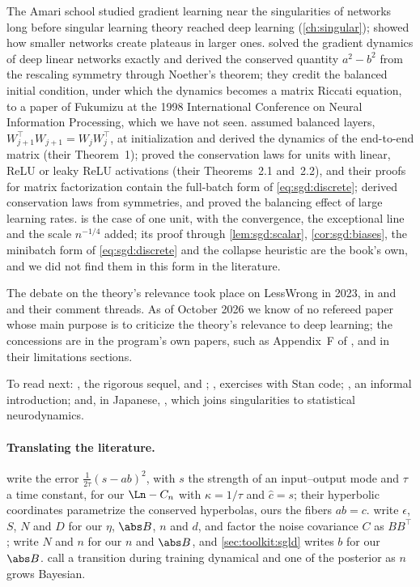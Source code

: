 \begin{refsection}
\notesandrefs
The Amari school studied gradient learning near the singularities of networks long before singular learning theory reached deep learning (\cref{ch:singular}); \textcite{FukumizuAmari2000} showed how smaller networks create plateaus in larger ones. \Textcite{SaxeEtAl2014} solved the gradient dynamics of deep linear networks exactly and derived the conserved quantity $a^2-b^2$ from the rescaling symmetry through Noether's theorem; they credit the balanced initial condition, under which the dynamics becomes a matrix Riccati equation, to a paper of Fukumizu at the 1998 International Conference on Neural Information Processing, which we have not seen. \Textcite{AroraEtAl2018} assumed balanced layers, $W_{j+1}^\top W_{j+1}=W_jW_j^\top$, at initialization and derived the dynamics of the end-to-end matrix (their Theorem~1); \textcite{DuEtAl2018} proved the conservation laws for units with linear, ReLU or leaky ReLU activations (their Theorems~2.1 and~2.2), and their proofs for matrix factorization contain the full-batch form of \eqref{eq:sgd:discrete}; \textcite{KuninEtAl2021} derived conservation laws from symmetries, and \textcite{WangEtAl2022} proved the balancing effect of large learning rates.  is the case of one unit, with the convergence, the exceptional line and the scale $n^{-1/4}$ added; its proof through \cref{lem:sgd:scalar}, \cref{cor:sgd:biases}, the minibatch form of \eqref{eq:sgd:discrete} and the collapse heuristic are the book's own, and we did not find them in this form in the literature.

The debate on the theory's relevance took place on LessWrong in 2023, in \textcite{Erdil2023} and \textcite{Skalse2023} and their comment threads. As of October 2026 we know of no refereed paper whose main purpose is to criticize the theory's relevance to deep learning; the concessions are in the program's own papers, such as Appendix~F of \textcite{LauEtAl2025}, and in their limitations sections.

To read next: \textcite{Watanabe2018}, the rigorous sequel, and \textcite{Watanabe2009}; \textcite{Suzuki2023a}, exercises with Stan code; \textcite{Carroll2023}, an informal introduction; and, in Japanese, \textcite{AmariWatanabe2026}, which joins singularities to statistical neurodynamics.

\paragraph{Translating the literature.} \Textcite{SaxeEtAl2014} write the error $\frac1{2\tau}(s-ab)^2$, with $s$ the strength of an input--output mode and $\tau$ a time constant, for our $\Ln-C_n$ with $\kappa=1/\tau$ and $\hat c=s$; their hyperbolic coordinates parametrize the conserved hyperbolas, ours the fibers $ab=c$. \Textcite{MandtEtAl2017} write $\epsilon$, $S$, $N$ and $D$ for our $\eta$, $\abs B$, $n$ and $d$, and factor the noise covariance $C$ as $BB^\top$; \textcite{WellingTeh2011} write $N$ and $n$ for our $n$ and $\abs B$, and \cref{sec:toolkit:sgld} writes $b$ for our $\abs B$. \Textcite{ChenEtAl2023} call a transition during training dynamical and one of the posterior as $n$ grows Bayesian.


\end{refsection}
